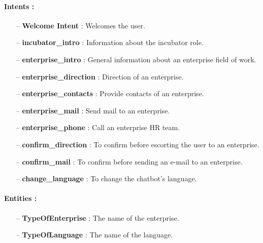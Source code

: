 \paragraph{\textbf{Intents :}}
\begin{itemize}
    \item[--] \textbf{Welcome Intent} : Welcomes the user.
    \item[--] \textbf{incubator\_intro} : Information about the incubator role.
    \item[--] \textbf{enterprise\_intro } : General information about an enterprise field of work.
    \item[--] \textbf{enterprise\_direction} : Direction of an enterprise.
    \item[--] \textbf{enterprise\_contacts} : Provide contacts of an enterprise.
    \item[--] \textbf{enterprise\_mail} : Send mail to an enterprise.
    \item[--] \textbf{enterprise\_phone} : Call an enterprise HR team.
    \item[--] \textbf{confirm\_direction} : To confirm before escorting the user to an enterprise.
    \item[--] \textbf{confirm\_mail} : To confirm before sending an e-mail to an enterprise.
    \item[--] \textbf{change\_language} : To change the chatbot's language.
\end{itemize}

\paragraph{Entities :}
\begin{itemize}
    \item[--] \textbf{TypeOfEnterprise} : The name of the enterprise.
    \item[--] \textbf{TypeOfLanguage} : The name of the language.
\end{itemize}

